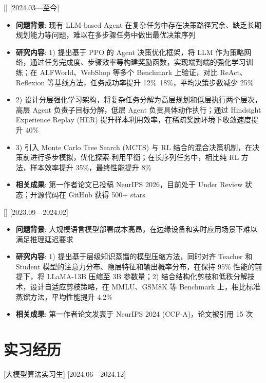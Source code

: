 \documentclass{resume-photo}
\begin{document}
[]
[2024.03—至今]

\begin{itemize}
  \item \textbf{问题背景}: 现有 LLM-based Agent 在复杂任务中存在决策路径冗余、缺乏长期规划能力等问题，难以在多步骤任务中做出最优决策序列
  \item \textbf{研究内容}: 1) 提出基于 PPO 的 Agent 决策优化框架，将 LLM 作为策略网络，通过任务完成度、步骤效率等构建奖励函数，实现端到端的强化学习训练；在 ALFWorld、WebShop 等多个 Benchmark 上验证，对比 ReAct、Reflexion 等基线方法，任务成功率提升 12\%~18\%，平均决策步数减少 25\%
  \item 2) 设计分层强化学习架构，将复杂任务分解为高层规划和低层执行两个层次，高层 Agent 负责子目标分解，低层 Agent 负责具体动作执行；通过 Hindsight Experience Replay (HER) 提升样本利用效率，在稀疏奖励环境下收敛速度提升 40\%
  \item 3) 引入 Monte Carlo Tree Search (MCTS) 与 RL 结合的混合决策机制，在决策前进行多步模拟，优化探索-利用平衡；在长序列任务中，相比纯 RL 方法，样本效率提升 35\%，最终性能提升 8\%
  \item \textbf{相关成果}: 第一作者论文已投稿 NeurIPS 2026，目前处于 Under Review 状态；开源代码在 GitHub 获得 500+ stars
\end{itemize}

[]
[2023.09—2024.02]

\begin{itemize}
  \item \textbf{问题背景}: 大规模语言模型部署成本高昂，在边缘设备和实时应用场景下难以满足推理延迟要求
  \item \textbf{研究内容}: 1) 提出基于层级知识蒸馏的模型压缩方法，同时对齐 Teacher 和 Student 模型的注意力分布、隐层特征和输出概率分布，在保持 95\% 性能的前提下，将 LLaMA-13B 压缩至 3B 参数量；2) 结合结构化剪枝和低秩分解技术，设计自适应剪枝策略，在 MMLU、GSM8K 等 Benchmark 上，相比标准蒸馏方法，平均性能提升 4.2\%
  \item \textbf{相关成果}: 第一作者论文发表于 NeurIPS 2024 (CCF-A)，论文被引用 15 次
\end{itemize}

\section{实习经历}

[\textnormal{大模型算法实习生}]
[2024.06—2024.12]
\end{document}
